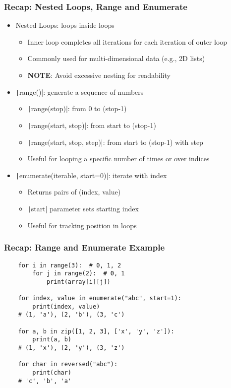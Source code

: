 \documentclass{beamer}
\begin{document}
\begin{frame}[fragile]
    \frametitle{Recap: Nested Loops, Range and Enumerate }
    \begin{itemize}
        \item Nested Loops: loops inside loops
              \begin{itemize}
                  \item Inner loop completes all iterations for each iteration of outer loop
                  \item Commonly used for multi-dimensional data (e.g., 2D lists)
                  \item \textbf{NOTE}: Avoid excessive nesting for readability
              \end{itemize}
        \item \texttt|range()|: generate a sequence of numbers
              \begin{itemize}
                  \item \texttt|range(stop)|: from 0 to (stop-1)
                  \item \texttt|range(start, stop)|: from start to (stop-1)
                  \item \texttt|range(start, stop, step)|: from start to (stop-1) with step
                  \item Useful for looping a specific number of times or over indices
              \end{itemize}
        \item \texttt|enumerate(iterable, start=0)|: iterate with index
              \begin{itemize}
                  \item Returns pairs of (index, value)
                  \item \texttt|start| parameter sets starting index
                  \item Useful for tracking position in loops
              \end{itemize}
    \end{itemize}
\end{frame}


\begin{frame}[fragile]
    \frametitle{Recap: Range and Enumerate Example}
    \begin{verbatim}
    for i in range(3):  # 0, 1, 2
        for j in range(2):  # 0, 1
            print(array[i][j])
    
    for index, value in enumerate("abc", start=1):
        print(index, value)
    # (1, 'a'), (2, 'b'), (3, 'c')

    for a, b in zip([1, 2, 3], ['x', 'y', 'z']):
        print(a, b)
    # (1, 'x'), (2, 'y'), (3, 'z')

    for char in reversed("abc"):
        print(char)
    # 'c', 'b', 'a'
    \end{verbatim}
\end{frame}
\end{document}
